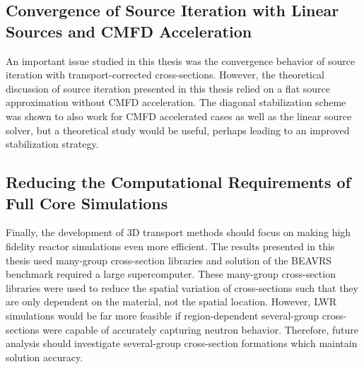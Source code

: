 \subsection{Convergence of Source Iteration with Linear Sources and CMFD Acceleration}

An important issue studied in this thesis was the convergence behavior of source iteration with transport-corrected cross-sections. However, the theoretical discussion of source iteration presented in this thesis relied on a flat source approximation without \ac{CMFD} acceleration. The diagonal stabilization scheme was shown to also work for \ac{CMFD} accelerated cases as well as the linear source solver, but a theoretical study would be useful, perhaps leading to an improved stabilization strategy.


\subsection{Reducing the Computational Requirements of Full Core Simulations}
	
Finally, the development of 3D transport methods should focus on making high fidelity reactor simulations even more efficient. The results presented in this thesis used many-group cross-section libraries and solution of the BEAVRS benchmark required a large supercomputer. These many-group cross-section libraries were used to reduce the spatial variation of cross-sections such that they are only dependent on the material, not the spatial location. However, \ac{LWR} simulations would be far more feasible if region-dependent several-group cross-sections were capable of accurately capturing neutron behavior. Therefore, future analysis should investigate several-group cross-section formations which maintain solution accuracy.